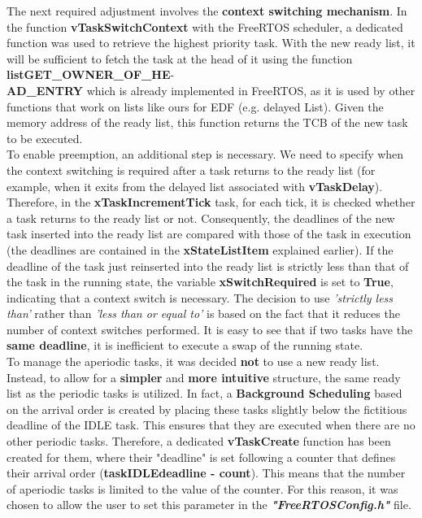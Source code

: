 \documentclass{article}
\begin{document}
 The next required adjustment involves the \textbf{context switching mechanism}. In the function \textbf{vTaskSwitchContext} with the FreeRTOS scheduler, a dedicated function was used to retrieve the highest priority task. With the new ready list, it will be sufficient to fetch the task at the head of it using the function \textbf{listGET\_OWNER\_OF\_HE}-\\\textbf{AD\_ENTRY} which is already implemented in FreeRTOS, as it is used by other functions that work on lists like ours for EDF (e.g. delayed List). Given the memory address of the ready list, this function returns the TCB of the new task to be executed.\\[0.1cm]
 To enable preemption, an additional step is necessary. We need to specify when the context switching is required after a task returns to the ready list (for example, when it exits from the delayed list associated with \textbf{vTaskDelay}). Therefore, in the \textbf{xTaskIncrementTick} task, for each tick, it is checked whether a task returns to the ready list or not. Consequently, the deadlines of the new task inserted into the ready list are compared with those of the task in execution (the deadlines are contained in the \textbf{xStateListItem} explained earlier). If the deadline of the task just reinserted into the ready list is strictly less than that of the task in the running state, the variable \textbf{xSwitchRequired} is set to \textbf{True}, indicating that a context switch is necessary. The decision to use \textit{'strictly less than'} rather than \textit{'less than or equal to'} is based on the fact that it reduces the number of context switches performed. It is easy to see that if two tasks have the \textbf{same deadline}, it is inefficient to execute a swap of the running state.\\[0.1cm]
To manage the aperiodic tasks, it was decided \textbf{not} to use a new ready list. Instead, to allow for a \textbf{simpler} and \textbf{more intuitive} structure, the same ready list as the periodic tasks is utilized. In fact, a \textbf{Background Scheduling} based on the arrival order is created by placing these tasks slightly below the fictitious deadline of the IDLE task. This ensures that they are executed when there are no other periodic tasks. Therefore, a dedicated \textbf{vTaskCreate} function has been created for them, where their "deadline" is set following a counter that defines their arrival order (\textbf{taskIDLEdeadline - count}). This means that the number of aperiodic tasks is limited to the value of the counter. For this reason, it was chosen to allow the user to set this parameter in the \textit{\textbf{"FreeRTOSConfig.h"}} file.
\end{document}
